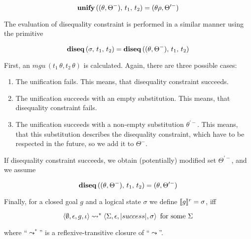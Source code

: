$$
{\bf unify}\,((\theta,\Theta^-),\,t_1,\,t_2)=(\theta\rho,\Theta^{\prime-})
$$

The evaluation of disequality constraint is performed in a similar manner using the primitive

$$
{\bf diseq}\,(\sigma,\,t_1,\,t_2)={\bf diseq}\,((\theta,\Theta^-),\,t_1,\,t_2)
$$

First, an $mgu\,(t_1\,\theta,t_2\,\theta)$ is calculated. Again, there are three
possible cases:

\begin{enumerate}
\item The unification fails. This means, that disequality constraint succeeds.
\item The unification succeeds with an empty substitution. This means, that disequality
constraint fails.
\item The unification succeeds with a non-empty substitution $\theta^{\prime-}$. This means, that 
this substitution describes the disequality constraint, which have to be respected in
the future, so we add it to $\Theta^-$. 
\end{enumerate}

If disequality constraint succeeds, we obtain (potentially) modified set $\Theta^{\prime-}$, and we
assume

$$
{\bf diseq}\,((\theta,\Theta^-),\,t_1,\,t_2)=(\theta,\Theta^{\prime-})
$$

Finally, for a closed goal $g$ and a logical state $\sigma$ we define $\llbracket{g}\rrbracket^r=\sigma$, iff

$$
\inbr{\emptyset,\epsilon,g,\iota}\leadsto^*\inbr{\Sigma,\epsilon,\lstinline|success|,\sigma}\mbox{ for some $\Sigma$}
$$
 
\noindent where ``$\leadsto^*$'' is a reflexive-transitive closure of ``$\leadsto$''. 




